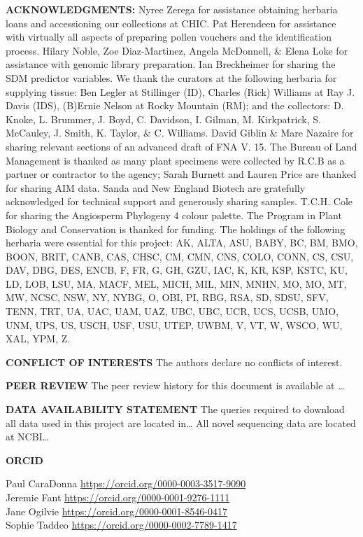 \documentclass[
]{article}
\begin{document}
\textbf{ACKNOWLEDGMENTS:} Nyree Zerega for assistance obtaining herbaria
loans and accessioning our collections at CHIC. Pat Herendeen for
assistance with virtually all aspects of preparing pollen vouchers and
the identification process. Hilary Noble, Zoe Diaz-Martinez, Angela
McDonnell, \& Elena Loke for assistance with genomic library
preparation. Ian Breckheimer for sharing the SDM predictor variables. We
thank the curators at the following herbaria for supplying tissue: Ben
Legler at Stillinger (ID), Charles (Rick) Williams at Ray J. Davis
(IDS), (B)Ernie Nelson at Rocky Mountain (RM); and the collectors: D.
Knoke, L. Brummer, J. Boyd, C. Davidson, I. Gilman, M. Kirkpatrick, S.
McCauley, J. Smith, K. Taylor, \& C. Williams. David Giblin \& Mare
Nazaire for sharing relevant sections of an advanced draft of FNA V. 15.
The Bureau of Land Management is thanked as many plant specimens were
collected by R.C.B as a partner or contractor to the agency; Sarah
Burnett and Lauren Price are thanked for sharing AIM data. Sanda and New
England Biotech are gratefully acknowledged for technical support and
generously sharing samples. T.C.H. Cole for sharing the Angiosperm
Phylogeny 4 colour palette. The Program in Plant Biology and
Conservation is thanked for funding. The holdings of the following
herbaria were essential for this project: AK, ALTA, ASU, BABY, BC, BM,
BMO, BOON, BRIT, CANB, CAS, CHSC, CM, CMN, CNS, COLO, CONN, CS, CSU,
DAV, DBG, DES, ENCB, F, FR, G, GH, GZU, IAC, K, KR, KSP, KSTC, KU, LD,
LOB, LSU, MA, MACF, MEL, MICH, MIL, MIN, MNHN, MO, MO, MT, MW, NCSC,
NSW, NY, NYBG, O, OBI, PI, RBG, RSA, SD, SDSU, SFV, TENN, TRT, UA, UAC,
UAM, UAZ, UBC, UBC, UCR, UCS, UCSB, UMO, UNM, UPS, US, USCH, USF, USU,
UTEP, UWBM, V, VT, W, WSCO, WU, XAL, YPM, Z.

\textbf{CONFLICT OF INTERESTS} The authors declare no conflicts of
interest.

\textbf{PEER REVIEW} The peer review history for this document is
available at \ldots{}

\textbf{DATA AVAILABILITY STATEMENT} The queries required to download
all data used in this project are located in\ldots{} All novel
sequencing data are located at NCBI\ldots{}

\textbf{ORCID}

Paul CaraDonna \url{https://orcid.org/0000-0003-3517-9090}\\
Jeremie Fant \url{https://orcid.org/0000-0001-9276-1111}\\
Jane Ogilvie \url{https://orcid.org/0000-0001-8546-0417}\\
Sophie Taddeo \url{https://orcid.org/0000-0002-7789-1417}
\end{document}
